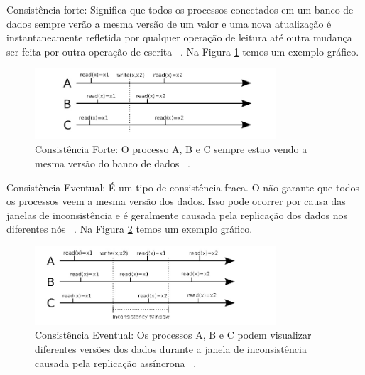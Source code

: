 Consistência forte: Significa que todos os processos conectados em um banco de dados sempre verão a mesma versão de um valor e uma nova atualização é instantaneamente refletida por qualquer operação de leitura até outra mudança ser feita por outra operação de escrita ~\cite{Orendanalysisand}. Na Figura \ref{fig:strongconsistency} temos um exemplo gráfico.

	\begin{figure}[!htbp]
		\begin{center}
			\includegraphics[width=0.8\textwidth]{strongconsistency}
		\end{center}
		\caption{Consistência Forte: O processo A, B e C sempre estao vendo a mesma versão do banco de dados ~\cite{Orendanalysisand}.}
		\label{fig:strongconsistency}
	\end{figure}

Consistência Eventual: É um tipo de consistência fraca. O não garante que todos os processos veem a mesma versão dos dados. Isso pode ocorrer por causa das janelas de inconsistência e é geralmente causada pela replicação dos dados nos diferentes nós ~\cite{Orendanalysisand}. Na Figura \ref{fig:eventualconsistency} temos um exemplo gráfico.

	\begin{figure}[!htbp]
		\begin{center}
			\includegraphics[width=0.8\textwidth]{eventualconsistency}
		\end{center}
		\caption{Consistência Eventual: Os processos A, B e C podem visualizar diferentes versões dos dados durante a janela de inconsistência causada pela replicação assíncrona ~\cite{Orendanalysisand}.}
		\label{fig:eventualconsistency}
	\end{figure}







